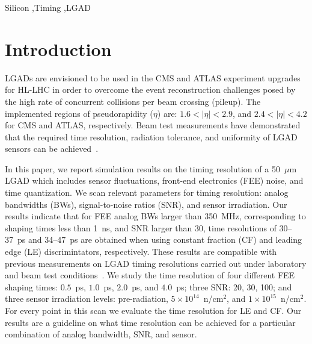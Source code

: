 \documentclass[preprint,1p]{elsarticle}
\begin{document}
\begin{frontmatter}
\begin{keyword}

Silicon \sep Timing \sep LGAD

\end{keyword}

\end{frontmatter}

\tableofcontents


\section{Introduction}

LGADs are envisioned to be used in the CMS and ATLAS experiment upgrades for HL-LHC in order to overcome
the event reconstruction challenges posed by the high rate of concurrent
collisions per beam crossing (pileup). The implemented regions of pseudorapidity ($\eta$)
are: $1.6< |\eta| <2.9$, and $2.4< |\eta|<4.2$ for CMS and ATLAS, respectively.%
 Beam test measurements have demonstrated that the required time resolution,
radiation tolerance, and uniformity of LGAD sensors can be achieved~\cite{Apresyan:2018oln}.

In this paper, we report simulation results on the
timing resolution of a 50~$\mu$m LGAD which includes sensor fluctuations,
front-end electronics (FEE) noise, and time quantization.
We scan relevant parameters for timing resolution: analog bandwidths (BWs),
signal-to-noise ratios (SNR), and sensor irradiation.
Our results indicate that for FEE analog BWs larger than 350~\si{MHz},
corresponding to shaping times less than 1~\si{ns}, and SNR larger than 30, time resolutions of 30--37~\si{ps} and 34--47~\si{ps}
are obtained when using constant fraction (CF) and leading edge (LE) discrimintators, respectively.
These results are compatible with previous measurements on LGAD timing resolutions carried out under
laboratory and beam test conditions~\cite{Apresyan:2018oln, Cartiglia201783, PELLEGRINI201412}.
We study the time resolution of four different FEE shaping times: $0.5$~\si{ps}, $1.0$~\si{ps},
$2.0$~\si{ps}, and $4.0$~\si{ps}; three SNR: 20, 30, 100; and three sensor irradiation
levels: pre-radiation, $5\times 10^{14}$~n/cm$^2$, and $1\times 10^{15}$~n/cm$^2$.
For every point in this scan we evaluate the time resolution for LE and CF.
Our results are a guideline on what time resolution can
be achieved for a particular combination of analog bandwidth, SNR, and sensor.
\end{document}
